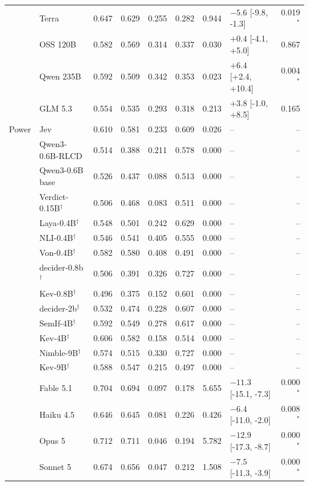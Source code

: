 \begin{longtable}{llrrrrrlr}
 & Terra & 0.647 & 0.629 & 0.255 & 0.282 & 0.944 & $-5.6$ [-9.8, -1.3] & 0.019$^{*}$ \\
 & OSS 120B & 0.582 & 0.569 & 0.314 & 0.337 & 0.030 & $+0.4$ [-4.1, +5.0] & 0.867 \\
 & Qwen 235B & 0.592 & 0.509 & 0.342 & 0.353 & 0.023 & $+6.4$ [+2.4, +10.4] & 0.004$^{*}$ \\
 & GLM 5.3 & 0.554 & 0.535 & 0.293 & 0.318 & 0.213 & $+3.8$ [-1.0, +8.5] & 0.165 \\
\midrule
Power & Jev & 0.610 & 0.581 & 0.233 & 0.609 & 0.026 & -- & -- \\
 & Qwen3-0.6B-RLCD & 0.514 & 0.388 & 0.211 & 0.578 & 0.000 & -- & -- \\
 & Qwen3-0.6B base & 0.526 & 0.437 & 0.088 & 0.513 & 0.000 & -- & -- \\
 & Verdict-0.15B$^{\dagger}$ & 0.506 & 0.468 & 0.083 & 0.511 & 0.000 & -- & -- \\
 & Laya-0.4B$^{\dagger}$ & 0.548 & 0.501 & 0.242 & 0.629 & 0.000 & -- & -- \\
 & NLI-0.4B$^{\dagger}$ & 0.546 & 0.541 & 0.405 & 0.555 & 0.000 & -- & -- \\
 & Von-0.4B$^{\dagger}$ & 0.582 & 0.580 & 0.408 & 0.491 & 0.000 & -- & -- \\
 & decider-0.8b$^{\dagger}$ & 0.506 & 0.391 & 0.326 & 0.727 & 0.000 & -- & -- \\
 & Kev-0.8B$^{\dagger}$ & 0.496 & 0.375 & 0.152 & 0.601 & 0.000 & -- & -- \\
 & decider-2b$^{\dagger}$ & 0.532 & 0.474 & 0.228 & 0.607 & 0.000 & -- & -- \\
 & SemIf-4B$^{\dagger}$ & 0.592 & 0.549 & 0.278 & 0.617 & 0.000 & -- & -- \\
 & Kev-4B$^{\dagger}$ & 0.606 & 0.582 & 0.158 & 0.514 & 0.000 & -- & -- \\
 & Nimble-9B$^{\dagger}$ & 0.574 & 0.515 & 0.330 & 0.727 & 0.000 & -- & -- \\
 & Kev-9B$^{\dagger}$ & 0.588 & 0.547 & 0.215 & 0.497 & 0.000 & -- & -- \\
 & Fable 5.1 & 0.704 & 0.694 & 0.097 & 0.178 & 5.655 & $-11.3$ [-15.1, -7.3] & 0.000$^{*}$ \\
 & Haiku 4.5 & 0.646 & 0.645 & 0.081 & 0.226 & 0.426 & $-6.4$ [-11.0, -2.0] & 0.008$^{*}$ \\
 & Opus 5 & 0.712 & 0.711 & 0.046 & 0.194 & 5.782 & $-12.9$ [-17.3, -8.7] & 0.000$^{*}$ \\
 & Sonnet 5 & 0.674 & 0.656 & 0.047 & 0.212 & 1.508 & $-7.5$ [-11.3, -3.9] & 0.000$^{*}$ \\

\end{longtable}
